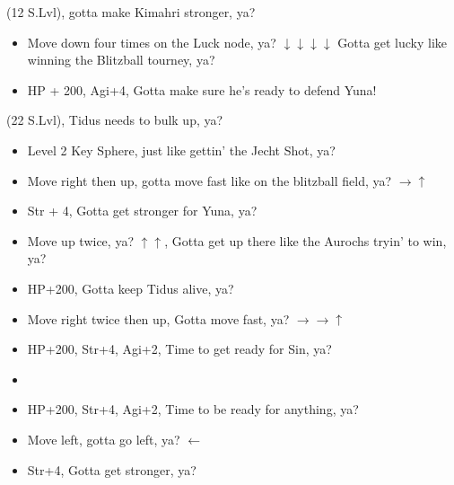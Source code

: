 \begin{spheregrid}
    \begin{itemize}
        \kimahrif (12 S.Lvl), gotta make Kimahri stronger, ya?
        \begin{itemize}
            \item Move down four times on the Luck node, ya? $\downarrow\downarrow\downarrow\downarrow$ Gotta get lucky like winning the Blitzball tourney, ya?
            \item HP + 200, Agi+4, Gotta make sure he's ready to defend Yuna!
        \end{itemize}
        \tidusf (22 S.Lvl), Tidus needs to bulk up, ya?
        \begin{itemize}
            \item Level 2 Key Sphere, just like gettin' the Jecht Shot, ya?
            \item Move right then up, gotta move fast like on the blitzball field, ya? $\rightarrow\uparrow$
            \item Str + 4, Gotta get stronger for Yuna, ya?
            \item Move up twice, ya? $\uparrow\uparrow$, Gotta get up there like the Aurochs tryin' to win, ya?
            \item HP+200, Gotta keep Tidus alive, ya?
            \item Move right twice then up, Gotta move fast, ya? $\rightarrow\rightarrow\uparrow$
            \item HP+200, Str+4, Agi+2, Time to get ready for Sin, ya?
            \item {}
            \item HP+200, Str+4, Agi+2, Time to be ready for anything, ya?
            \item Move left, gotta go left, ya? $\leftarrow$
            \item Str+4, Gotta get stronger, ya?
        \end{itemize}
    \end{itemize}
\end{spheregrid}
